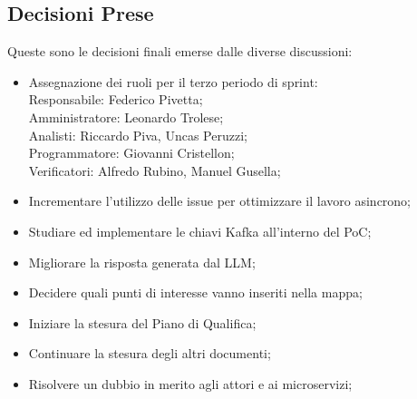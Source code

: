 \documentclass[10pt]{article}
\begin{document}
\subsection{Decisioni Prese}
Queste sono le decisioni finali emerse dalle diverse discussioni:
\begin{itemize}
    \item Assegnazione dei ruoli per il terzo periodo di sprint:\\
            \vspace{1mm}
            Responsabile: Federico Pivetta;\\
            Amministratore: Leonardo Trolese;\\
            Analisti: Riccardo Piva, Uncas Peruzzi;\\
            Programmatore: Giovanni Cristellon;\\
            Verificatori: Alfredo Rubino, Manuel Gusella;\\
    \item Incrementare l'utilizzo delle issue per ottimizzare il lavoro asincrono;
    \item Studiare ed implementare le chiavi Kafka all'interno del PoC;
    \item Migliorare la risposta generata dal LLM;
    \item Decidere quali punti di interesse vanno inseriti nella mappa;
    \item Iniziare la stesura del Piano di Qualifica;
    \item Continuare la stesura degli altri documenti;
    \item Risolvere un dubbio in merito agli attori e ai microservizi;
\end{itemize}
\end{document}
